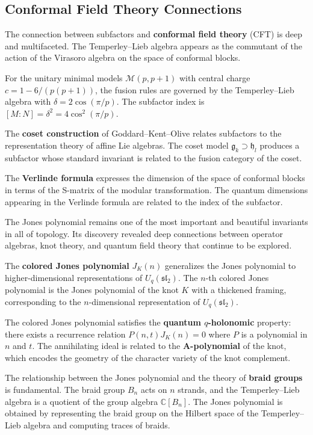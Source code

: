 \subsection*{Conformal Field Theory Connections}

The connection between subfactors and \textbf{conformal field theory} (CFT) is deep and multifaceted. The Temperley--Lieb algebra appears as the commutant of the action of the Virasoro algebra on the space of conformal blocks.

For the unitary minimal models $\mathcal{M}(p, p+1)$ with central charge $c = 1 - 6/(p(p+1))$, the fusion rules are governed by the Temperley--Lieb algebra with $\delta = 2\cos(\pi/p)$. The subfactor index is $[M:N] = \delta^2 = 4\cos^2(\pi/p)$.

The \textbf{coset construction} of Goddard--Kent--Olive relates subfactors to the representation theory of affine Lie algebras. The coset model $\mathfrak{g}_k \supset \mathfrak{h}_l$ produces a subfactor whose standard invariant is related to the fusion category of the coset.

The \textbf{Verlinde formula} expresses the dimension of the space of conformal blocks in terms of the S-matrix of the modular transformation. The quantum dimensions appearing in the Verlinde formula are related to the index of the subfactor.

The Jones polynomial remains one of the most important and beautiful invariants in all of topology. Its discovery revealed deep connections between operator algebras, knot theory, and quantum field theory that continue to be explored.

The \textbf{colored Jones polynomial} $J_K(n)$ generalizes the Jones polynomial to higher-dimensional representations of $U_q(\mathfrak{sl}_2)$. The $n$-th colored Jones polynomial is the Jones polynomial of the knot $K$ with a thickened framing, corresponding to the $n$-dimensional representation of $U_q(\mathfrak{sl}_2)$.

The colored Jones polynomial satisfies the \textbf{quantum $q$-holonomic} property: there exists a recurrence relation $P(n, t) J_K(n) = 0$ where $P$ is a polynomial in $n$ and $t$. The annihilating ideal is related to the \textbf{A-polynomial} of the knot, which encodes the geometry of the character variety of the knot complement.

The relationship between the Jones polynomial and the theory of \textbf{braid groups} is fundamental. The braid group $B_n$ acts on $n$ strands, and the Temperley--Lieb algebra is a quotient of the group algebra $\mathbb{C}[B_n]$. The Jones polynomial is obtained by representing the braid group on the Hilbert space of the Temperley--Lieb algebra and computing traces of braids.

